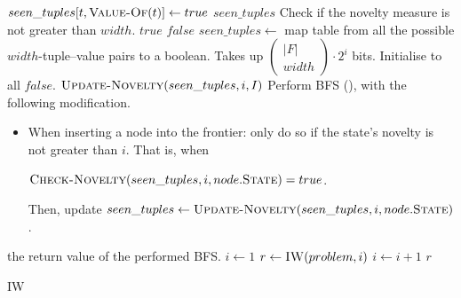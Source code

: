 \begin{algorithm}[hbtp]
\newcommand{\nchoosek}[2]{\left(\begin{array}{c}#1 \\ #2 \end{array}\right)}
\begin{algorithmic}
      \State $seen\_tuples[t, \Call{Value-Of}{t}] \gets true$
    \EndFor
    \State \Return $seen\_tuples$
  \EndFunction
  \State \Comment Check if the novelty measure is not greater than $width$.
       \Return $true$
      \EndIf
    \EndFor
    \State \Return $false$
  \EndFunction
    \State $seen\_tuples \gets$ map table from all the possible
      $width$-tuple--value pairs to a boolean. Takes up $\nchoosek{|F|}{width}\cdot
      2^i$ bits. Initialise to all $false$.
    \State $\Call{Update-Novelty}{seen\_tuples, i, I}$
    \State Perform \ac{BFS} (), with the following modification.
    \begin{itemize}
	  \item[] When inserting a node into the frontier: only do so if the
		  state's novelty is not greater than $i$. That is, when

        $\Call{Check-Novelty}{seen\_tuples, i, node.\textsc{State}} = true$.

        Then, update $seen\_tuples \gets \Call{Update-Novelty}{seen\_tuples, i,
        node.\textsc{State}}$.
    \end{itemize}
    \State \Return the return value of the performed \ac{BFS}.
  \EndFunction
    \State $i \gets 1$
    \Repeat
      \State $r \gets \Call{IW}{problem, i}$
      \State $i \gets i+1$
    \State \Return $r$
  \EndFunction
\end{algorithmic}
\caption{\acl{IW} \citep{lipovetzky2012width}}
\label{alg:iterated-width}
\end{algorithm}


